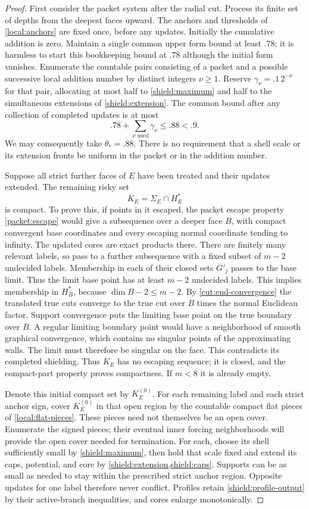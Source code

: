 \documentclass[11pt]{article}
\numberwithin{equation}{section}
\theoremstyle{definition}
\theoremstyle{remark}
\begin{document}
\begin{proof}
First consider the packet system after the radial cut.  Process its
finite set of depths from the deepest faces upward.  The anchors and
thresholds of \cref{local:anchors} are fixed once, before any updates.
Initially the cumulative addition is zero.  Maintain a single common
upper form bound at least $.78$; it is harmless to start this bookkeeping
bound at $.78$ although the initial form vanishes.  Enumerate the
countable pairs consisting of a packet and a possible successive local
addition number by distinct integers $\nu\ge1$.  Reserve
$\gamma_\nu=.1\,2^{-\nu}$ for that pair, allocating at most half to
\cref{shield:maximum} and half to the simultaneous extensions of
\cref{shield:extension}.  The common bound after any collection of
completed updates is at most
\[
 .78+\sum_{\nu\text{ used}}\gamma_\nu\le .88<.9.
\]
We may consequently take $\theta_*=.88$.  There is no requirement
that a shell scale or its extension fronts be uniform in the packet
or in the addition number.

Suppose all strict further faces of $E$ have been treated and their
updates extended.  The remaining risky set
\[
 K_E=\Sigma_E\cap H_E^*
\]
is compact.  To prove this, if points in it escaped, the packet escape
property \cref{packet:escape} would give a subsequence over a deeper
face $B$, with compact convergent base coordinates and every escaping
normal coordinate tending to infinity.  The updated cores are exact
products there.  There are finitely many relevant labels, so pass to a further
subsequence with a fixed subset of $m-2$ undecided labels.
Membership in each of their closed sets $G'_j$ passes to the base
limit.  Thus the limit base point has at least $m-2$ undecided labels.
This implies membership in $H_B^*$, because
$\dim B-2\le m-2$.  By \cref{cut:end-convergence} the translated true
cuts converge to the true cut over $B$ times the normal Euclidean
factor.  Support convergence puts the limiting base point on the true
boundary over $B$.  A regular limiting boundary point would have a neighborhood
of smooth graphical convergence, which contains no singular points of
the approximating walls.  The limit must therefore be singular on the
face.  This contradicts its completed shielding.  Thus $K_E$ has no
escaping sequence; it is closed, and the compact-part property proves
compactness.  If $m<8$ it is already empty.

Denote this initial compact set by $K_E^{(0)}$.  For each remaining
label and each strict anchor sign, cover $K_E^{(0)}$ in that open
region by the countable compact flat pieces of \cref{local:flat-pieces}.
These pieces need not themselves be an open cover.  Enumerate the
signed pieces; their eventual inner forcing neighborhoods will provide
the open cover needed for termination.  For each,
choose its shell sufficiently small by \cref{shield:maximum}, then
hold that scale fixed and extend its caps, potential, and core by
\cref{shield:extension,shield:caps}.  Supports can be as small as needed
to stay within the prescribed strict anchor region.  Opposite updates
for one label therefore never conflict.  Profiles retain
\cref{shield:profile-output} by their active-branch inequalities, and
cores enlarge monotonically.


\end{proof}
\end{document}
